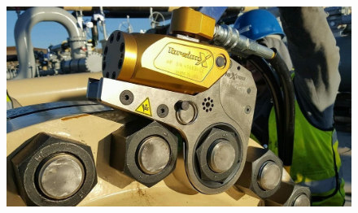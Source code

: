 \begin{multicols}{2}
	\begin{figure}[H]
		\vspace*{-5pt}
		\centering
		\captionsetup{labelformat= empty, justification=centering}
		\includegraphics[width= 1\linewidth]{24}
		

\end{figure}
\end{multicols}
